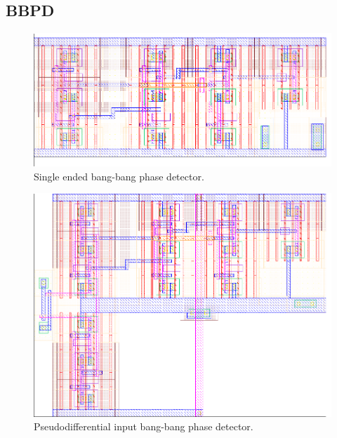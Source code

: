 		\subsection{BBPD}\label{sec:lay_bbpd}
			\begin{figure}[htb!]
			        \centering
			        \includegraphics[width=\textwidth, angle=0]{./figs/layout/layout_bbpd}
			    \caption{Single ended bang-bang phase detector.}
			\end{figure}
			\begin{figure}[htb!]
			        \centering
			        \includegraphics[width=\textwidth, angle=0]{./figs/layout/layout_bbpd_pseudodiff}
			    \caption{Pseudodifferential input bang-bang phase detector.}
			\end{figure}
		\FloatBarrier\pagebreak
